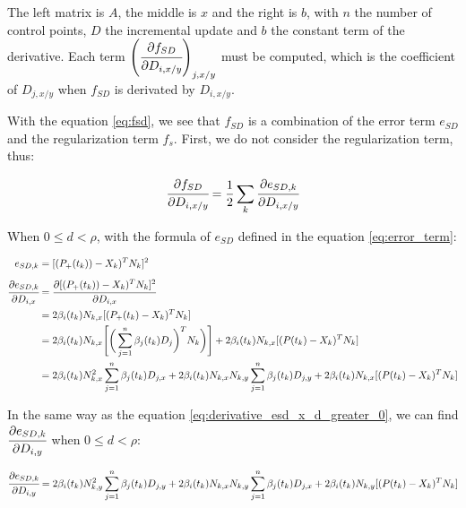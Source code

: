 \documentclass{article}
\newcommand{\vsp}{\vspace{\baselineskip}}
\begin{document}
The left matrix is $A$, the middle is $x$ and the right is $b$, with $n$ the number of control points, $D$ the incremental update and $b$ the constant term of the derivative. Each term $\Bigg( \cfrac{\partial f_{SD}}{\partial D_{i,x/y}} \Bigg) _{j,x/y}$ must be computed, which is the coefficient of $D_{j,x/y}$ when $f_{SD}$ is derivated by $D_{i,x/y}$.

\vsp

With the equation \ref{eq:fsd}, we see that $f_{SD}$ is a combination of the error term $e_{SD}$ and the regularization term $f_s$. First, we do not consider the regularization term, thus:

\begin{equation}
    \cfrac{\partial f_{SD}}{\partial D_{i,x/y}} = 
    \frac{1}{2} \sum_{k} \cfrac{\partial e_{SD,k}}{\partial D_{i,x/y}}
\end{equation}

When $0 \leq d < \rho$, with the formula of $e_{SD}$ defined in the equation \ref{eq:error_term}:

\begin{equation}
\label{eq:derivative_esd_x_d_greater_0}
    \begin{aligned}
        e_{SD,k} & = [(P_+(t_k))-X_k)^T N_k]^2 
        \\[5pt]
        \cfrac{\partial e_{SD,k}}{\partial D_{i,x}} 
        & = \cfrac{\partial [(P_+(t_k))-X_k)^T N_k]^2}{\partial D_{i,x}} 
        \\
        & = 2\beta_i(t_k)N_{k,x}[(P_+(t_k)-X_k)^T N_k]
        \\
        & = 2\beta_i(t_k)N_{k,x}
        \Bigg[ \bigg( \sum \limits_{j=1}^{n} \beta_j(t_k)D_j \bigg) ^T N_k \bigg) \Bigg]
        + 2\beta_i(t_k)N_{k,x} [(P(t_k)-X_k)^T N_k]
        \\
        & = 2\beta_i(t_k)N_{k,x}^2 \sum \limits_{j=1}^{n} \beta_j(t_k)D_{j,x} 
        + 2\beta_i(t_k)N_{k,x}N_{k,y} \sum \limits_{j=1}^{n} \beta_j(t_k)D_{j,y} 
        + 2\beta_i(t_k)N_{k,x} [(P(t_k)-X_k)^T N_k]
    \end{aligned}
\end{equation}

In the same way as the equation \ref{eq:derivative_esd_x_d_greater_0}, we can find $\cfrac{\partial e_{SD,k}}{\partial D_{i,y}}$ when $0 \leq d < \rho$:

\begin{equation}
\label{eq:derivative_esd_y_d_greater_0}
    \cfrac{\partial e_{SD,k}}{\partial D_{i,y}} 
     = 2\beta_i(t_k)N_{k,y}^2 \sum \limits_{j=1}^{n} \beta_j(t_k)D_{j,y} 
    + 2\beta_i(t_k)N_{k,x}N_{k,y} \sum \limits_{j=1}^{n} \beta_j(t_k)D_{j,x} 
    + 2\beta_i(t_k)N_{k,y} [(P(t_k)-X_k)^T N_k]
\end{equation}
\end{document}

